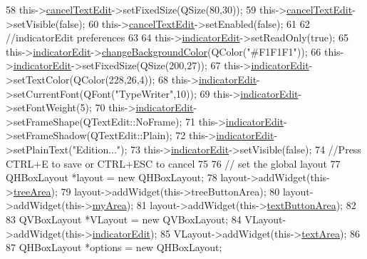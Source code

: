 \begin{DoxyCode}
58     this->\hyperlink{classArea_a48b08ee11ec952b793e8d92dfc9ef7d4}{cancelTextEdit}->setFixedSize(QSize(80,30));
59     this->\hyperlink{classArea_a48b08ee11ec952b793e8d92dfc9ef7d4}{cancelTextEdit}->setVisible(\textcolor{keyword}{false});
60     this->\hyperlink{classArea_a48b08ee11ec952b793e8d92dfc9ef7d4}{cancelTextEdit}->setEnabled(\textcolor{keyword}{false});
61 
62     \textcolor{comment}{//indicatorEdit preferences}
63 
64     this->\hyperlink{classArea_a330747ed9932e54f1fb3c5a8089149b9}{indicatorEdit}->setReadOnly(\textcolor{keyword}{true});
65     this->\hyperlink{classArea_a330747ed9932e54f1fb3c5a8089149b9}{indicatorEdit}->\hyperlink{classTextArea_acdfa220612113b805f8653dce6b7624e}{changeBackgroundColor}(QColor(\textcolor{stringliteral}{"#F1F1F1"}));
66     this->\hyperlink{classArea_a330747ed9932e54f1fb3c5a8089149b9}{indicatorEdit}->setFixedSize(QSize(200,27));
67     this->\hyperlink{classArea_a330747ed9932e54f1fb3c5a8089149b9}{indicatorEdit}->setTextColor(QColor(228,26,4));
68     this->\hyperlink{classArea_a330747ed9932e54f1fb3c5a8089149b9}{indicatorEdit}->setCurrentFont(QFont(\textcolor{stringliteral}{"TypeWriter"},10));
69     this->\hyperlink{classArea_a330747ed9932e54f1fb3c5a8089149b9}{indicatorEdit}->setFontWeight(5);
70     this->\hyperlink{classArea_a330747ed9932e54f1fb3c5a8089149b9}{indicatorEdit}->setFrameShape(QTextEdit::NoFrame);
71     this->\hyperlink{classArea_a330747ed9932e54f1fb3c5a8089149b9}{indicatorEdit}->setFrameShadow(QTextEdit::Plain);
72     this->\hyperlink{classArea_a330747ed9932e54f1fb3c5a8089149b9}{indicatorEdit}->setPlainText(\textcolor{stringliteral}{"Edition..."});
73     this->\hyperlink{classArea_a330747ed9932e54f1fb3c5a8089149b9}{indicatorEdit}->setVisible(\textcolor{keyword}{false});
74     \textcolor{comment}{//Press CTRL+E to save or CTRL+ESC to cancel}
75 
76     \textcolor{comment}{// set the global layout}
77     QHBoxLayout *layout = \textcolor{keyword}{new} QHBoxLayout;
78     layout->addWidget(this->\hyperlink{classArea_a950b6ed9a4e754ef1a7879b727ea8749}{treeArea});
79     layout->addWidget(this->treeButtonArea);
80     layout->addWidget(this->\hyperlink{classArea_a3c00ea9bb14425efbee3fcf80410c4cf}{myArea});
81     layout->addWidget(this->\hyperlink{classArea_a6c88fecf579e816309421ebb2f4110e8}{textButtonArea});
82 
83     QVBoxLayout *VLayout = \textcolor{keyword}{new} QVBoxLayout;
84     VLayout->addWidget(this->\hyperlink{classArea_a330747ed9932e54f1fb3c5a8089149b9}{indicatorEdit});
85     VLayout->addWidget(this->\hyperlink{classArea_a001e5b841c3e4126a128de13171f05d3}{textArea});
86 
87     QHBoxLayout *options = \textcolor{keyword}{new} QHBoxLayout;

\end{DoxyCode}
